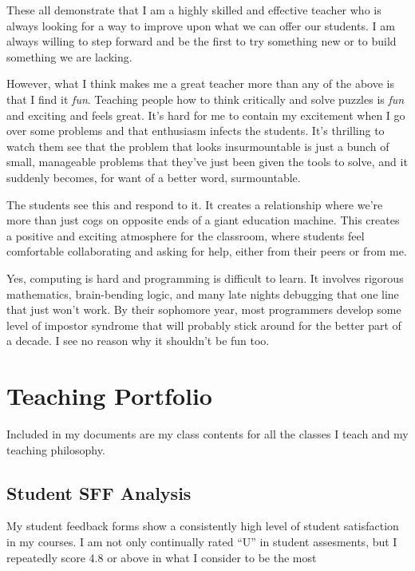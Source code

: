 \documentclass[]{article}
\begin{document}

These all demonstrate that I am a highly skilled and effective teacher who is always looking for a way to improve upon what we can offer our students. I am always willing to step forward and be the first to try something new or to build something we are lacking.

However, what I think makes me a great teacher more than any of the above is that I find it \textit{fun}.  
Teaching people how to think critically and solve puzzles is \textit{fun} and exciting and feels great.
It's hard for me to contain my excitement when I go  over some problems and that enthusiasm infects the students.
It's thrilling to watch them see that the problem that looks insurmountable is just a bunch of small, manageable problems that they've just been given the tools to solve,  and it suddenly becomes, for want of a better word, surmountable.


The students see this and respond to it.
It creates a relationship where we're more than just cogs on opposite ends of a giant education machine.
This creates a positive and exciting atmosphere for the classroom, where students feel comfortable collaborating and asking for help, either from their peers or from me.


Yes, computing is hard and programming is difficult to learn.
It involves rigorous mathematics, brain-bending logic, and many late nights debugging that one line that just won't work.
By their sophomore year, most programmers develop some level of impostor syndrome that will probably  stick around for the better part of a decade. 
I see no reason why it shouldn't be fun too.


\section{Teaching Portfolio}
Included in my documents are my class contents for all the classes I teach and my teaching philosophy.




\subsection{Student SFF Analysis}
My student feedback forms show a consistently high level of student satisfaction in my courses.
I am not only continually rated ``U'' in student assesments, but I repeatedly score 4.8 or above in what I consider to be the most  
\end{document}
